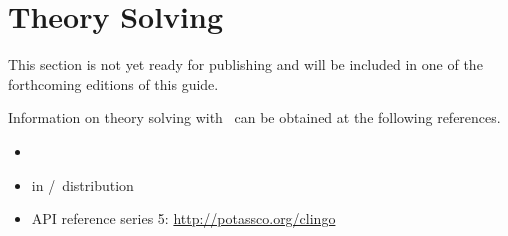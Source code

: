 \section{Theory Solving}\label{sec:theory}

This section is not yet ready for publishing
and will be included in one of the forthcoming editions of this guide.

Information on theory solving with \clingo\ can be obtained at the following references.

\begin{itemize}
\item \cite{kascwa17a}
\item {} in \gringo/\clingo\ distribution
\item API reference \clingo{} series 5: \url{http://potassco.org/clingo}
\end{itemize}

